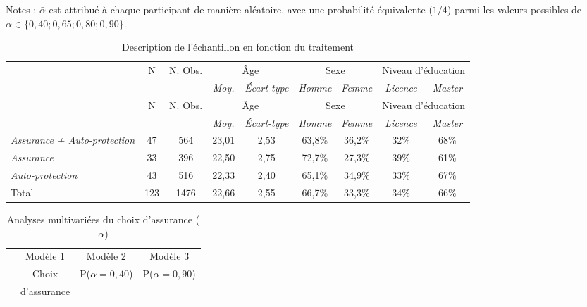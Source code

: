 \documentclass[11pt]{article}
\begin{document}
{\footnotesize Notes : $\bar{\alpha}$ est attribué à chaque participant de manière aléatoire, avec une probabilité équivalente ($1/4$) parmi les valeurs possibles de $\alpha \in \{0,40; 0,65; 0,80; 0,90\}$. \\
\normalsize
\newpage

\footnotesize

\begin{longtable}[c]{lcccccccc}
\caption{Description de l'échantillon en fonction du traitement}
\label{tab:sample} \\
\hline\hline
        & \multicolumn{1}{c}{N}& \multicolumn{1}{c}{N. Obs.}& \multicolumn{2}{c}{Âge} & \multicolumn{2}{c}{Sexe} & \multicolumn{2}{c}{Niveau d'éducation}\\
        & & & \textit{Moy.} & \textit{Écart-type} & \textit{Homme} & \textit{Femme} & \textit{Licence} & \textit{Master} \\
\hline
\endfirsthead

\hline\hline
          & \multicolumn{1}{c}{N}& \multicolumn{1}{c}{N. Obs.}& \multicolumn{2}{c}{Âge} & \multicolumn{2}{c}{Sexe} & \multicolumn{2}{c}{Niveau d'éducation}\\
        & & & \textit{Moy.} & \textit{Écart-type} & \textit{Homme} & \textit{Femme} & \textit{Licence} & \textit{Master} \\
\hline
\endhead

\hline
\endfoot

\hline\hline
\endlastfoot
\textit{Assurance + Auto-protection} & 47 & 564 & 23,01 & 2,53 & 63,8\% & 36,2\% & 32\% & 68\% \\
\textit{Assurance} & 33 & 396 & 22,50 & 2,75 & 72,7\% & 27,3\% & 39\% & 61\%\\
\textit{Auto-protection} & 43 & 516 & 22,33 & 2,40 & 65,1\% & 34,9\% & 33\% & 67\% \\
Total & 123 & 1476 & 22,66 & 2,55 & 66,7\% & 33,3\% & 34\% & 66\%\\
\end{longtable}

\normalsize


\newpage



\footnotesize

\begin{longtable}[c]{lc@{\hspace{0mm}}lc@{\hspace{0mm}}lc@{\hspace{0mm}}l}
\caption{Analyses multivariées du choix d'assurance ($\alpha$)}
\label{tab:insurance_main_results} \\
\hline\hline
        &\multicolumn{2}{c}{Modèle 1}&\multicolumn{2}{c}{Modèle 2}&\multicolumn{2}{c}{Modèle 3}\\
        &\multicolumn{2}{c}{Choix}&\multicolumn{2}{c}{P($\alpha=0,40$)}&\multicolumn{2}{c}{P($\alpha=0,90$)}\\
        &\multicolumn{2}{c}{d'assurance}&\\
\hline
\endfirsthead


\end{longtable}}
\end{document}
